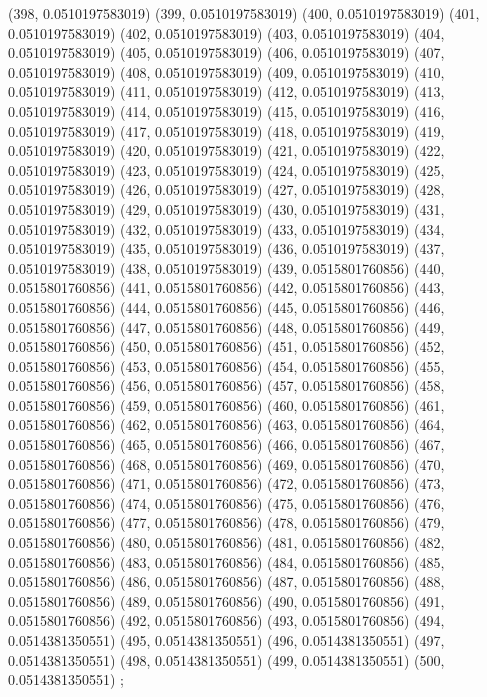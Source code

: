 {					(398, 0.0510197583019)
					(399, 0.0510197583019)
					(400, 0.0510197583019)
					(401, 0.0510197583019)
					(402, 0.0510197583019)
					(403, 0.0510197583019)
					(404, 0.0510197583019)
					(405, 0.0510197583019)
					(406, 0.0510197583019)
					(407, 0.0510197583019)
					(408, 0.0510197583019)
					(409, 0.0510197583019)
					(410, 0.0510197583019)
					(411, 0.0510197583019)
					(412, 0.0510197583019)
					(413, 0.0510197583019)
					(414, 0.0510197583019)
					(415, 0.0510197583019)
					(416, 0.0510197583019)
					(417, 0.0510197583019)
					(418, 0.0510197583019)
					(419, 0.0510197583019)
					(420, 0.0510197583019)
					(421, 0.0510197583019)
					(422, 0.0510197583019)
					(423, 0.0510197583019)
					(424, 0.0510197583019)
					(425, 0.0510197583019)
					(426, 0.0510197583019)
					(427, 0.0510197583019)
					(428, 0.0510197583019)
					(429, 0.0510197583019)
					(430, 0.0510197583019)
					(431, 0.0510197583019)
					(432, 0.0510197583019)
					(433, 0.0510197583019)
					(434, 0.0510197583019)
					(435, 0.0510197583019)
					(436, 0.0510197583019)
					(437, 0.0510197583019)
					(438, 0.0510197583019)
					(439, 0.0515801760856)
					(440, 0.0515801760856)
					(441, 0.0515801760856)
					(442, 0.0515801760856)
					(443, 0.0515801760856)
					(444, 0.0515801760856)
					(445, 0.0515801760856)
					(446, 0.0515801760856)
					(447, 0.0515801760856)
					(448, 0.0515801760856)
					(449, 0.0515801760856)
					(450, 0.0515801760856)
					(451, 0.0515801760856)
					(452, 0.0515801760856)
					(453, 0.0515801760856)
					(454, 0.0515801760856)
					(455, 0.0515801760856)
					(456, 0.0515801760856)
					(457, 0.0515801760856)
					(458, 0.0515801760856)
					(459, 0.0515801760856)
					(460, 0.0515801760856)
					(461, 0.0515801760856)
					(462, 0.0515801760856)
					(463, 0.0515801760856)
					(464, 0.0515801760856)
					(465, 0.0515801760856)
					(466, 0.0515801760856)
					(467, 0.0515801760856)
					(468, 0.0515801760856)
					(469, 0.0515801760856)
					(470, 0.0515801760856)
					(471, 0.0515801760856)
					(472, 0.0515801760856)
					(473, 0.0515801760856)
					(474, 0.0515801760856)
					(475, 0.0515801760856)
					(476, 0.0515801760856)
					(477, 0.0515801760856)
					(478, 0.0515801760856)
					(479, 0.0515801760856)
					(480, 0.0515801760856)
					(481, 0.0515801760856)
					(482, 0.0515801760856)
					(483, 0.0515801760856)
					(484, 0.0515801760856)
					(485, 0.0515801760856)
					(486, 0.0515801760856)
					(487, 0.0515801760856)
					(488, 0.0515801760856)
					(489, 0.0515801760856)
					(490, 0.0515801760856)
					(491, 0.0515801760856)
					(492, 0.0515801760856)
					(493, 0.0515801760856)
					(494, 0.0514381350551)
					(495, 0.0514381350551)
					(496, 0.0514381350551)
					(497, 0.0514381350551)
					(498, 0.0514381350551)
					(499, 0.0514381350551)
					(500, 0.0514381350551)
				};
